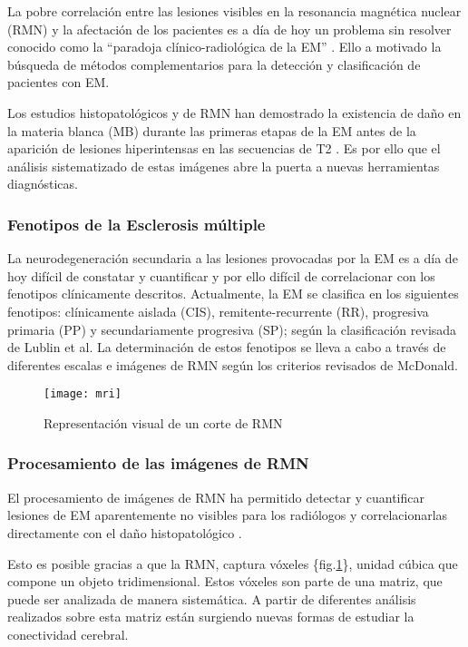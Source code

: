 \documentclass[fleqn,10pt]{UICArticle} %
\begin{document}
La pobre correlación entre las lesiones visibles en la resonancia magnética nuclear (RMN) y la afectación de los pacientes es a día de hoy un problema sin resolver conocido como la “paradoja clínico-radiológica de la EM” \cite{Barkhof2002}. Ello a motivado la búsqueda de métodos complementarios para la detección y clasificación de pacientes con EM.

Los estudios histopatológicos y de RMN han demostrado la existencia de daño en la materia blanca (MB) durante las primeras etapas de la EM antes de la aparición de lesiones hiperintensas en las secuencias de T2 \cite{Beer2016}. Es por ello que el análisis sistematizado de estas imágenes abre la puerta a nuevas herramientas diagnósticas.

\subsubsection{Fenotipos de la Esclerosis múltiple}

La neurodegeneración secundaria a las lesiones provocadas por la EM es a día de hoy difícil de constatar y cuantificar y por ello difícil de correlacionar con los fenotipos clínicamente descritos. Actualmente, la EM se clasifica en los siguientes fenotipos: clínicamente aislada (CIS), remitente-recurrente (RR), progresiva primaria (PP) y secundariamente progresiva (SP); según la clasificación revisada de Lublin et al\cite{Lublin2014}. La determinación de estos fenotipos se lleva a cabo a través de diferentes escalas e imágenes de RMN según los criterios revisados de McDonald\cite{Polman20112}.

\begin{figure}[h]
	\centering
	\texttt{[image: mri]}
	\caption{Representación visual de un corte de RMN}
	\label{fig:voxeles}
\end{figure}

\subsubsection{Procesamiento de las imágenes de RMN}

El procesamiento de imágenes de RMN ha permitido detectar y cuantificar lesiones de EM aparentemente no visibles para los radiólogos y correlacionarlas directamente con el daño histopatológico \cite{Beer2016}.

Esto es posible gracias a que la RMN, captura vóxeles \{fig.\ref{fig:voxeles}\}, unidad cúbica que compone un objeto tridimensional. Estos vóxeles son parte de una matriz, que puede ser analizada de manera sistemática. A partir de diferentes análisis realizados sobre esta matriz están surgiendo nuevas formas de estudiar la conectividad cerebral.
\end{document}
